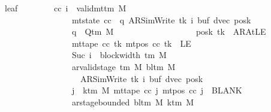 \begin{isabellebody}
\ \ \ leaf{\isacharcolon}{\kern0pt}\isanewline
\ \ \ \ \ \ \ \ {\isachardoublequoteopen}{\isasymAnd}cc\ i{\isachardot}{\kern0pt}\ {\isasymlbrakk}\ valid{\isacharunderscore}{\kern0pt}mttm\ M{\isacharsemicolon}{\kern0pt}\isanewline
\ \ \ \ \ \ \ \ \ \ \ \ \ \ \ \ \ \ \ mt{\isacharunderscore}{\kern0pt}state\ cc\ {\isacharequal}{\kern0pt}\ {\isacharparenleft}{\kern0pt}q{\isacharcomma}{\kern0pt}\ AR{\isacharunderscore}{\kern0pt}SimWrite{\isacharcomma}{\kern0pt}\ tk{\isacharcomma}{\kern0pt}\ i{\isacharcomma}{\kern0pt}\ buf{\isacharcomma}{\kern0pt}\ dvec{\isacharcomma}{\kern0pt}\ posk{\isacharparenright}{\kern0pt}{\isacharsemicolon}{\kern0pt}\isanewline
\ \ \ \ \ \ \ \ \ \ \ \ \ \ \ \ \ \ \ q\ {\isasymin}\ Q{\isacharunderscore}{\kern0pt}tm\ M{\isacharsemicolon}{\kern0pt}\isanewline
\ \ \ \ \ \ \ \ \ \ \ \ \ \ \ \ \ \ \ posk\ tk\ {\isasymnoteq}\ AR{\isacharunderscore}{\kern0pt}AtLE{\isacharsemicolon}{\kern0pt}\isanewline
\ \ \ \ \ \ \ \ \ \ \ \ \ \ \ \ \ \ \ mt{\isacharunderscore}{\kern0pt}tape\ cc\ tk\ {\isacharparenleft}{\kern0pt}mt{\isacharunderscore}{\kern0pt}pos\ cc\ tk{\isacharparenright}{\kern0pt}\ {\isasymnoteq}\ LE{}{\isacharsemicolon}{\kern0pt}\isanewline
\ \ \ \ \ \ \ \ \ \ \ \ \ \ \ \ \ \ \ Suc\ i\ {\isasymle}\ block{\isacharunderscore}{\kern0pt}width\ {\isacharparenleft}{\kern0pt}{\isasymGamma}{\isacharunderscore}{\kern0pt}tm\ M{\isacharparenright}{\kern0pt}{\isacharsemicolon}{\kern0pt}\isanewline
\ \ \ \ \ \ \ \ \ \ \ \ \ \ \ \ \ \ \ ar{\isacharunderscore}{\kern0pt}valid{\isacharunderscore}{\kern0pt}stage\ {\isacharparenleft}{\kern0pt}{\isasymGamma}{\isacharunderscore}{\kern0pt}tm\ M{\isacharparenright}{\kern0pt}\ {\isacharparenleft}{\kern0pt}bl{\isacharunderscore}{\kern0pt}tm\ M{\isacharparenright}{\kern0pt}\isanewline
\ \ \ \ \ \ \ \ \ \ \ \ \ \ \ \ \ \ \ \ \ {\isacharparenleft}{\kern0pt}AR{\isacharunderscore}{\kern0pt}SimWrite{\isacharcomma}{\kern0pt}\ tk{\isacharcomma}{\kern0pt}\ i{\isacharcomma}{\kern0pt}\ buf{\isacharcomma}{\kern0pt}\ dvec{\isacharcomma}{\kern0pt}\ posk{\isacharparenright}{\kern0pt}{\isacharsemicolon}{\kern0pt}\isanewline
\ \ \ \ \ \ \ \ \ \ \ \ \ \ \ \ \ \ \ {\isasymforall}j\ {\isasymge}\ k{\isacharunderscore}{\kern0pt}tm\ M{\isachardot}{\kern0pt}\ mt{\isacharunderscore}{\kern0pt}tape\ cc\ j\ {\isacharparenleft}{\kern0pt}mt{\isacharunderscore}{\kern0pt}pos\ cc\ j{\isacharparenright}{\kern0pt}\ {\isacharequal}{\kern0pt}\ BLANK{}{\isacharsemicolon}{\kern0pt}\isanewline
\ \ \ \ \ \ \ \ \ \ \ \ \ \ \ \ \ \ \ ar{\isacharunderscore}{\kern0pt}stage{\isacharunderscore}{\kern0pt}bounded\ {\isacharparenleft}{\kern0pt}bl{\isacharunderscore}{\kern0pt}tm\ M{\isacharparenright}{\kern0pt}\ {\isacharparenleft}{\kern0pt}k{\isacharunderscore}{\kern0pt}tm\ M{\isacharparenright}{\kern0pt}\isanewline

\end{isabellebody}
